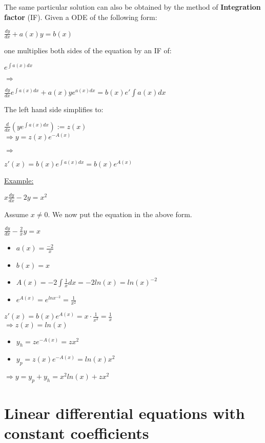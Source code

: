 \documentclass[8pt]{extreport}
\begin{document}
The same particular solution can also be obtained by the method of \textbf{Integration factor} (IF). Given a ODE of the following form:
\begin{center}
$\frac{dy}{dx} + a(x)y = b(x)$
\end{center}
one multiplies both sides of the equation by an IF of:
\begin{center}
$e^{\int a(x)dx}$
\end{center}
$\Rightarrow$
\begin{center}
$\frac{dy}{dx}e^{\int a(x)dx} + a(x)ye^{a(x)dx} = b(x)e'{\int a(x) dx}$
\end{center}
The left hand side simplifies to:
\begin{center}
$\frac{d}{dx}(ye^{\int a(x)dx}) := z(x)$\\
$\Rightarrow y = z(x)e^{-A(x)}$
\end{center}
$\Rightarrow$
\begin{center}
$z'(x) = b(x)e^{\int a(x) dx} = b(x) e^{A(x)}$
\end{center}
\underline {Example:}
\begin{center}
$ x \frac{dy}{dx} -2y = x^2$
\end{center}
Assume $x \neq 0$. We now put the equation in the above form.
\begin{center}
$\frac{dy}{dx} - \frac{2}{x}y = x$
\end{center}
\begin{itemize}
\item $a(x) = \frac{-2}{x}$
\item $b(x) = x$
\item $A(x) = -2\int\frac{1}{x}dx = -2ln(x) = ln(x)^{-2}$
\item $e^{A(x)} = e^{lnx^{-2}} = \frac{1}{x^2}$
\end{itemize}
$z'(x) = b(x) e^{A(x)} = x \cdot \frac{1}{x^2} = \frac{1}{x}$\\
$\Rightarrow z(x) = ln(x)$\\
\begin{itemize}
\item $y_h = ze^{-A(x)} = zx^2$
\item $y_p =z(x)e^{-A(x)} = ln(x)x^2$
\end{itemize}
$\Rightarrow y = y_p +y_h = x^2ln(x) + zx^2$

\section{Linear differential equations with constant coefficients}
\end{document}
